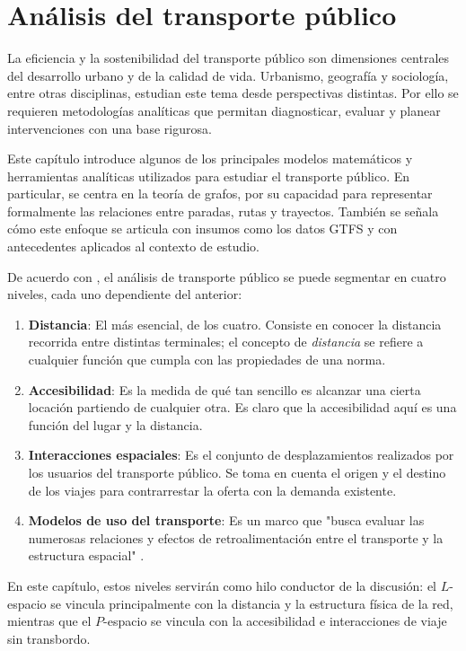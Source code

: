 \chapter{Análisis del transporte público}

	La eficiencia y la sostenibilidad del transporte público son dimensiones centrales del desarrollo urbano y de la calidad de vida. Urbanismo, geografía y sociología, entre otras disciplinas, estudian este tema desde perspectivas distintas. Por ello se requieren metodologías analíticas que permitan diagnosticar, evaluar y planear intervenciones con una base rigurosa.

	Este capítulo introduce algunos de los principales modelos matemáticos y herramientas analíticas utilizados para estudiar el transporte público. En particular, se centra en la teoría de grafos, por su capacidad para representar formalmente las relaciones entre paradas, rutas y trayectos. También se señala cómo este enfoque se articula con insumos como los datos GTFS y con antecedentes aplicados al contexto de estudio.

    De acuerdo con \cite{rodrigues2020}, el análisis de transporte público se puede segmentar en cuatro niveles, cada uno dependiente del anterior:
    \begin{enumerate}
        \item \textbf{Distancia}: El más esencial, de los cuatro. Consiste en conocer la distancia recorrida entre distintas terminales; el concepto de \textit{distancia} se refiere a cualquier función que cumpla con las propiedades de una norma.
        \item \textbf{Accesibilidad}: Es la medida de qué tan sencillo es alcanzar una cierta locación partiendo de cualquier otra. Es claro que la accesibilidad aquí es una función del lugar y la distancia.
        \item \textbf{Interacciones espaciales}: Es el conjunto de desplazamientos realizados por los usuarios del transporte público. Se toma en cuenta el origen y el destino de los viajes para contrarrestar la oferta con la demanda existente.
        \item \textbf{Modelos de uso del transporte}: Es un marco que "busca evaluar las numerosas relaciones y efectos de retroalimentación entre el transporte y la estructura espacial" \cite{rodrigues2020}.
    \end{enumerate}

    En este capítulo, estos niveles servirán como hilo conductor de la discusión: el $L$-espacio se vincula principalmente con la distancia y la estructura física de la red, mientras que el $P$-espacio se vincula con la accesibilidad e interacciones de viaje sin transbordo.


